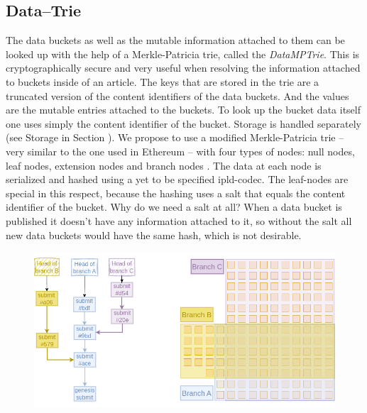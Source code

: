 \documentclass[14pt]{article}
\begin{document}
\subsection{Data--Trie}
\label{ssc:datatrie}

The data buckets as well as the mutable information attached to them can be looked up with the help of a Merkle-Patricia trie, called the \textit{DataMPTrie}. This is cryptographically secure and very useful when resolving the information attached to buckets inside of an article. The keys that are stored in the trie are a truncated version of the content identifiers of the data buckets. And the values are the mutable entries attached to the buckets. To look up the bucket data itself one uses simply the content identifier of the bucket. Storage is handled separately (see Storage in Section \label{ssc:storage}).
We propose to use a modified Merkle-Patricia trie -- very similar to the one used in Ethereum -- with four types of nodes: null nodes, leaf nodes, extension nodes and branch nodes \cite{}.
The data at each node is serialized and hashed using a yet to be specified ipld-codec. The leaf-nodes are special in this respect, because the hashing uses a salt that equals the content identifier of the bucket. Why do we need a salt at all? When a data bucket is published it doesn't have any information attached to it, so without the salt all new data buckets would have the same hash, which is not desirable.





\begin{figure}[b!]
  \begin{center}
    \includegraphics[width=1.0\textwidth]{img/BranchBucketRelationV2.png}
\end{center}
 \caption{}
 \label{fig:branchbucketrel}
\end{figure}
\end{document}

